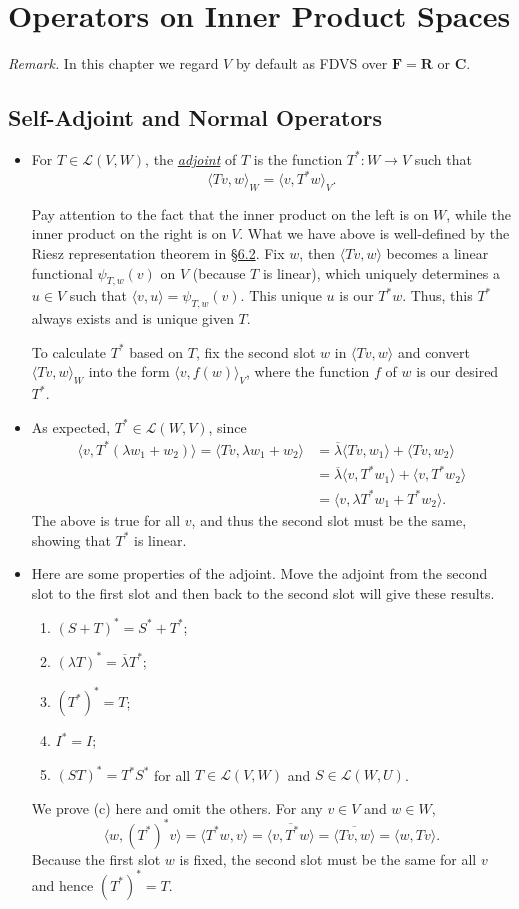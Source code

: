 \documentclass[11pt]{article}
\newcommand{\lk}[2]{\hyperlink{subsection.#1.#2}{\S#1.#2}}
\newcommand{\df}[1]{\ul{\textit{\textsf{#1}}}}
\newcommand{\R}{\mathbf{R}}
\newcommand{\C}{\mathbf{C}}
\newcommand{\F}{\mathbf{F}}
\newcommand{\conj}[1]{\overline{#1}}
\newcommand{\inp}[2]{\langle #1, #2 \rangle}
\newcommand{\LVW}{\mathcal{L}(V,W)}
\begin{document}
\newpage
\section{Operators on Inner Product Spaces}
\textit{Remark.} In this chapter we regard $V$ by default as FDVS over $\F = \R$ or $\C$.
\subsection{Self-Adjoint and Normal Operators}
\begin{itemize}
    \item For $T \in \LVW$, the \df{adjoint} of $T$ is the function $T^*: W \to V$ such that $$\inp{Tv}{w}_W = \inp{v}{T^*w}_V.$$
    
    Pay attention to the fact that the inner product on the left is on $W$, while the inner product on the right is on $V$. What we have above is well-defined by the Riesz representation theorem in \lk{6}{2}. Fix $w$, then $\inp{Tv}{w}$ becomes a linear functional $\psi_{T,w}(v)$ on $V$ (because $T$ is linear), which uniquely determines a $u \in V$ such that $\inp{v}{u} = \psi_{T,w}(v)$. This unique $u$ is our $T^*w$. Thus, this $T^*$ always exists and is unique given $T$.
    
    To calculate $T^*$ based on $T$, fix the second slot $w$ in $\inp{Tv}{w}$ and convert $\inp{Tv}{w}_W$ into the form $\inp{v}{f(w)}_V$, where the function $f$ of $w$ is our desired $T^*$.
    \item As expected, $T^* \in \mathcal{L}(W,V)$, since
    \begin{align*}
        \inp{v}{T^*(\lambda w_1 + w_2)} = \inp{Tv}{\lambda w_1 + w_2} & = \conj{\lambda}\inp{Tv}{w_1} + \inp{Tv}{w_2} \\ & = \conj{\lambda}\inp{v}{T^*w_1} + \inp{v}{T^*w_2} \\ & = \inp{v}{\lambda T^* w_1 + T^*w_2}.
    \end{align*}
    The above is true for all $v$, and thus the second slot must be the same, showing that $T^*$ is linear.
    \item Here are some properties of the adjoint. Move the adjoint from the second slot to the first slot and then back to the second slot will give these results.
    \begin{enumerate}[label=(\alph*)]
        \item $(S+T)^* = S^* + T^*$;
        \item $(\lambda T)^* = \conj{\lambda}T^*$;
        \item $(T^*)^* = T$;
        \item $I^* = I$;
        \item $(ST)^* = T^*S^*$ for all $T \in \LVW$ and $S \in \mathcal{L}(W,U)$.
    \end{enumerate}
    We prove (c) here and omit the others. For any $v \in V$ and $w \in W$, $$\inp{w}{(T^*)^*v} = \inp{T^*w}{v} = \conj{\inp{v}{T^*w}} = \conj{\inp{Tv}{w}} = \inp{w}{Tv}.$$ Because the first slot $w$ is fixed, the second slot must be the same for all $v$ and hence $(T^*)^*=T$.
    

\end{itemize}
\end{document}
